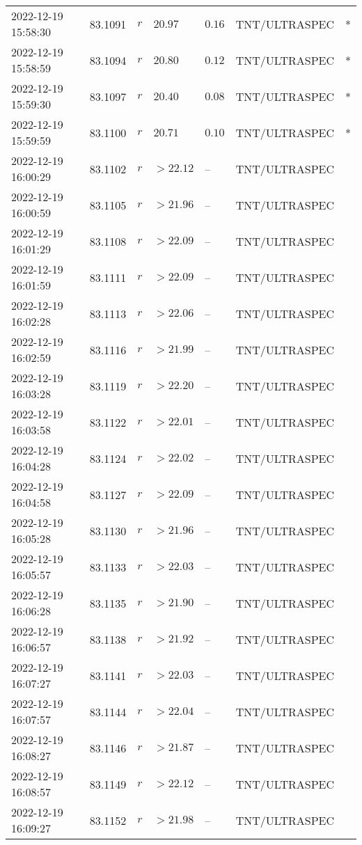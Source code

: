 \documentclass{nature_plusfigure}
\begin{document}
\begin{supplement}
\begin{center}
\begin{longtable}{lllllll}
2022-12-19 15:58:30 & 83.1091 & $r$ & $20.97$ & $0.16$ & TNT/ULTRASPEC & * \\ 
2022-12-19 15:58:59 & 83.1094 & $r$ & $20.80$ & $0.12$ & TNT/ULTRASPEC & * \\ 
2022-12-19 15:59:30 & 83.1097 & $r$ & $20.40$ & $0.08$ & TNT/ULTRASPEC & * \\ 
2022-12-19 15:59:59 & 83.1100 & $r$ & $20.71$ & $0.10$ & TNT/ULTRASPEC & * \\ 
2022-12-19 16:00:29 & 83.1102 & $r$ & $>22.12$ & -- & TNT/ULTRASPEC &  \\ 
2022-12-19 16:00:59 & 83.1105 & $r$ & $>21.96$ & -- & TNT/ULTRASPEC &  \\ 
2022-12-19 16:01:29 & 83.1108 & $r$ & $>22.09$ & -- & TNT/ULTRASPEC &  \\ 
2022-12-19 16:01:59 & 83.1111 & $r$ & $>22.09$ & -- & TNT/ULTRASPEC &  \\ 
2022-12-19 16:02:28 & 83.1113 & $r$ & $>22.06$ & -- & TNT/ULTRASPEC &  \\ 
2022-12-19 16:02:59 & 83.1116 & $r$ & $>21.99$ & -- & TNT/ULTRASPEC &  \\ 
2022-12-19 16:03:28 & 83.1119 & $r$ & $>22.20$ & -- & TNT/ULTRASPEC &  \\ 
2022-12-19 16:03:58 & 83.1122 & $r$ & $>22.01$ & -- & TNT/ULTRASPEC &  \\ 
2022-12-19 16:04:28 & 83.1124 & $r$ & $>22.02$ & -- & TNT/ULTRASPEC &  \\ 
2022-12-19 16:04:58 & 83.1127 & $r$ & $>22.09$ & -- & TNT/ULTRASPEC &  \\ 
2022-12-19 16:05:28 & 83.1130 & $r$ & $>21.96$ & -- & TNT/ULTRASPEC &  \\ 
2022-12-19 16:05:57 & 83.1133 & $r$ & $>22.03$ & -- & TNT/ULTRASPEC &  \\ 
2022-12-19 16:06:28 & 83.1135 & $r$ & $>21.90$ & -- & TNT/ULTRASPEC &  \\ 
2022-12-19 16:06:57 & 83.1138 & $r$ & $>21.92$ & -- & TNT/ULTRASPEC &  \\ 
2022-12-19 16:07:27 & 83.1141 & $r$ & $>22.03$ & -- & TNT/ULTRASPEC &  \\ 
2022-12-19 16:07:57 & 83.1144 & $r$ & $>22.04$ & -- & TNT/ULTRASPEC &  \\ 
2022-12-19 16:08:27 & 83.1146 & $r$ & $>21.87$ & -- & TNT/ULTRASPEC &  \\ 
2022-12-19 16:08:57 & 83.1149 & $r$ & $>22.12$ & -- & TNT/ULTRASPEC &  \\ 
2022-12-19 16:09:27 & 83.1152 & $r$ & $>21.98$ & -- & TNT/ULTRASPEC &  \\ 

\end{longtable}
\end{center}
\end{supplement}
\end{document}
